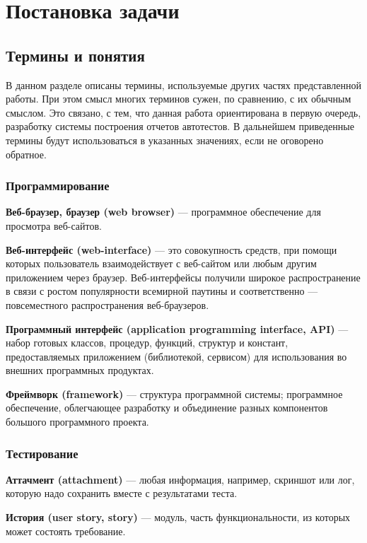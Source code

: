 \chapter{Постановка задачи}
\label{chapter1}

\section{Термины и понятия}

В данном разделе описаны термины, используемые других частях представленной работы. При этом смысл многих терминов сужен, по сравнению, с их обычным смыслом. Это связано, с тем, что данная работа ориентирована в первую очередь, разработку системы построения отчетов автотестов. В дальнейшем приведенные термины будут использоваться в указанных значениях, если не оговорено обратное.

\subsection{Программирование}

{\bf Веб-браузер, браузер (web browser)} --- 
программное обеспечение для просмотра веб-сайтов.

{\bf Веб-интерфейс (web-interface)} --- 
это совокупность средств, при помощи которых пользователь взаимодействует с веб-сайтом или любым другим приложением через браузер. Веб-интерфейсы получили широкое распространение в связи с ростом популярности всемирной паутины и соответственно --- повсеместного распространения веб-браузеров.

{\bf Программный интерфейс (application programming interface, API)} --- 
набор готовых классов, процедур, функций, структур и констант, предоставляемых приложением (библиотекой, сервисом) для использования во внешних программных продуктах. 

{\bf Фреймворк (framework)} --- 
структура программной системы; программное обеспечение, облегчающее разработку и объединение разных компонентов большого программного проекта.

\subsection{Тестирование}

{\bf Аттачмент (attachment)} ---
любая информация, например, скриншот или лог, которую надо сохранить вместе с результатами теста.  

{\bf История (user story, story)} ---
модуль, часть функциональности, из которых может состоять требование.

